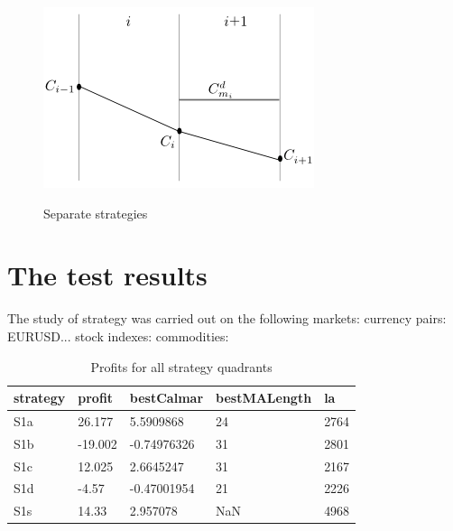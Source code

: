 \documentclass{tewiart}
\begin{document}
\begin{figure}[h]
\begin{minipage}{.49\linewidth}
\label{cztero}
\end{minipage}
\begin{minipage}{.49\linewidth}
\centering 
\includegraphics[width=\textwidth]{rysunek2d.png}
\label{mansard}
\end{minipage}
\caption{Separate strategies}
\end{figure}
\FloatBarrier


\section{The test results}
The study of strategy was carried out on the following markets:
currency pairs: EURUSD...
stock indexes: 
commodities: 

\begin{table}[!t]
\caption{Profits for all strategy quadrants} 
 \begin{center} 
 \begin{tabular}{|l|l|l|l|l|} 
 \hline \textbf{strategy} & \textbf{profit} & \textbf{bestCalmar} & \textbf{bestMALength} & \textbf{la} \\ \hline  
S1a & 26.177 & 5.5909868 & 24 & 2764\\ \hline 
S1b & -19.002 & -0.74976326 & 31 & 2801\\ \hline 
S1c & 12.025 & 2.6645247 & 31 & 2167\\ \hline 
S1d & -4.57 & -0.47001954 & 21 & 2226\\ \hline 
S1s & 14.33 & 2.957078 & NaN & 4968\\ 
\hline \end{tabular} 
 \end{center} 
 \end{table}
\FloatBarrier
\end{document}
